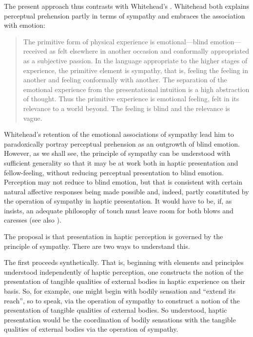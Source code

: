 The present approach thus contrasts with Whitehead's \citeyearpar{Whitehead:1978zr}. Whitehead both explains perceptual prehension partly in terms of sympathy and embraces the association with emotion:
\begin{quote}
	The primitive form of physical experience is emotional---blind emotion---received as felt elsewhere in another occasion and conformally appropriated as a subjective passion. In the language appropriate to the higher stages of experience, the primitive element is sympathy, that is, feeling the feeling in another and feeling conformally with another. The separation of the emotional experience from the presentational intuition is a high abstraction of thought. Thus the primitive experience is emotional feeling, felt in its relevance to a world beyond. The feeling is blind and the relevance is vague. \citep[162-3]{Whitehead:1978zr}
\end{quote}
Whitehead's retention of the emotional associations of sympathy lead him to paradoxically portray perceptual prehension as an outgrowth of blind emotion. However, as we shall see, the principle of sympathy can be understood with sufficient generality so that it may be at work both in haptic presentation and fellow-feeling, without reducing perceptual presentation to blind emotion. Perception may not reduce to blind emotion, but that is consistent with certain natural affective responses being made possible and, indeed, partly constituted by the operation of sympathy in haptic presentation. It would have to be, if, as \citet[chapter 4]{Derrida:2005aa} insists, an adequate philosophy of touch must leave room for both blows and caresses (see also \citealt{Wyschogrod:1981qp}).

The proposal is that presentation in haptic perception is governed by the principle of sympathy. There are two ways to understand this. 

The first proceeds synthetically. That is, beginning with elements and principles understood independently of haptic perception, one constructs the notion of the presentation of tangible qualities of external bodies in haptic experience on their basis. So, for example, one might begin with bodily sensation and ``extend its reach'', so to speak, via the operation of sympathy to construct a notion of the presentation of tangible qualities of external bodies. So understood, haptic presentation would be the coordination of bodily sensations with the tangible qualities of external bodies via the operation of sympathy. 

